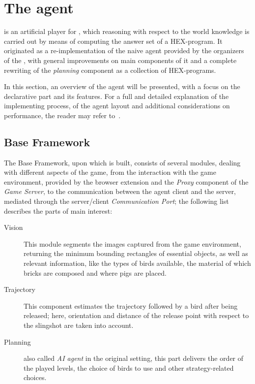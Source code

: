 \section{The \ah agent}
\label{sec:agent}
\ah is an artificial player for \ab,
which reasoning with respect to
the world knowledge is carried out by
means of computing the answer set of a
HEX-program.
It originated as a re-implementation of
the naive agent provided by the organizers
of the \abc \cite{angryAI},
with general improvements on main components
of it and a complete rewriting of the
\emph{planning} component as a collection
of HEX-programs.

In this section, an overview of the \ah
agent will be presented, with a focus on
the declarative part and its features. 
For a full and detailed explanation of
the implementing process, of the agent
layout and additional considerations on
performance, the reader may refer to~\cite{angryhex}.

\subsection{Base Framework}

The Base Framework, upon which \ah is built,
consists of several modules, dealing with
different aspects of the game, from 
the interaction with the game environment,
provided by the \ab browser
extension and the \emph{Proxy} component of
the \emph{Game Server}, to the communication
between the agent client and the server,
mediated through the server/client \emph{Communication Port};
the following list describes the parts of main interest:
\begin{description}
    \item[Vision] This module segments the images
    captured from the game environment, returning
    the minimum bounding rectangles of essential
    objects, as well as relevant information,
    like the types of birds available, the material
    of which bricks are composed and where pigs are placed.
    \item[Trajectory] This component estimates
    the trajectory followed by a bird after being
    released; here, orientation and distance of 
    the release point with respect to the slingshot
    are taken into account.
    \item[Planning] also called \emph{AI agent} in the
    original setting, this part delivers the order
    of the played levels, the choice of birds to use
    and other strategy-related choices.
\end{description}

